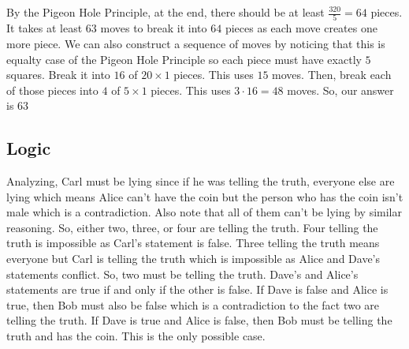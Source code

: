 \documentclass[11pt]{article}
\begin{document}

\begin{sol} 
By the Pigeon Hole Principle, at the end, there should be at least $\frac{320}{5}=64$ pieces. It takes at least $63$ moves to break it into $64$ pieces as each move creates one more piece. We can also construct a sequence of moves by noticing that this is equalty case of the Pigeon Hole Principle so each piece must have exactly $5$ squares. Break it into $16$ of $20\times 1$ pieces. This uses $15$ moves. Then, break each of those pieces into $4$ of $5\times 1$ pieces. This uses $3\cdot 16=48$ moves. So, our answer is $\boxed{63}$
\end{sol}


\subsection{Logic}

\begin{sol}
Analyzing, Carl must be lying since if he was telling the truth, everyone else are lying which means Alice can't have the coin but the person who has the coin isn't male which is a contradiction. Also note that all of them can't be lying by similar reasoning. So, either two, three, or four are telling the truth. Four telling the truth is impossible as Carl's statement is false. Three telling the truth means everyone but Carl is telling the truth which is impossible as Alice and Dave's statements conflict. So, two must be telling the truth. Dave's and Alice's statements are true if and only if the other is false. If Dave is false and Alice is true, then Bob must also be false which is a contradiction to the fact two are telling the truth. If Dave is true and Alice is false, then Bob must be telling the truth and  has the coin. This is the only possible case.
\end{sol}
\end{document}
